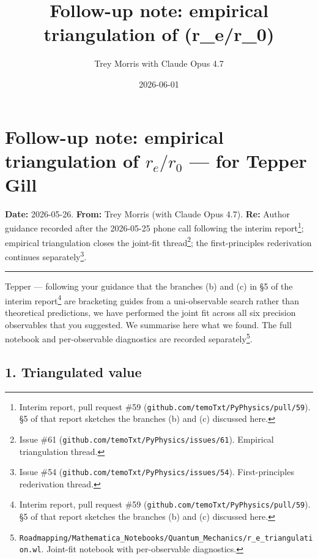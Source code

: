 \documentclass[
  11pt,
]{article}
\title{Follow-up note: empirical triangulation of (r\_e/r\_0)}
\author{Trey Morris with Claude Opus 4.7}
\date{2026-06-01}
\begin{document}
\maketitle

\hypertarget{follow-up-note-empirical-triangulation-of-r_er_0-for-tepper-gill}{%
\section{\texorpdfstring{Follow-up note: empirical triangulation of
\(r_e/r_0\) --- for Tepper
Gill}{Follow-up note: empirical triangulation of r\_e/r\_0 --- for Tepper Gill}}\label{follow-up-note-empirical-triangulation-of-r_er_0-for-tepper-gill}}

\textbf{Date:} 2026-05-26. \textbf{From:} Trey Morris (with Claude Opus
4.7). \textbf{Re:} Author guidance recorded after the 2026-05-25 phone
call following the interim report\footnote{Interim report, pull request
  \#59 (\texttt{github.com/temoTxt/PyPhysics/pull/59}). §5 of that
  report sketches the branches (b) and (c) discussed here.}; empirical
triangulation closes the joint-fit thread\footnote{Issue \#61
  (\texttt{github.com/temoTxt/PyPhysics/issues/61}). Empirical
  triangulation thread.}; the first-principles rederivation continues
separately\footnote{Issue \#54
  (\texttt{github.com/temoTxt/PyPhysics/issues/54}). First-principles
  rederivation thread.}.

\begin{center}\rule{0.5\linewidth}{0.5pt}\end{center}

Tepper --- following your guidance that the branches (b) and (c) in §5
of the interim report\footnote{Interim report, pull request \#59
  (\texttt{github.com/temoTxt/PyPhysics/pull/59}). §5 of that report
  sketches the branches (b) and (c) discussed here.} are bracketing
guides from a uni-observable search rather than theoretical predictions,
we have performed the joint fit across all six precision observables
that you suggested. We summarise here what we found. The full notebook
and per-observable diagnostics are recorded separately\footnote{\texttt{Roadmapping/Mathematica\_Notebooks/Quantum\_Mechanics/r\_e\_triangulation.wl}.
  Joint-fit notebook with per-observable diagnostics.}.

\hypertarget{triangulated-value}{%
\subsection{1. Triangulated value}\label{triangulated-value}}
\end{document}
